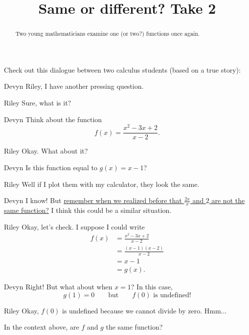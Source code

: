 \documentclass{ximera}
\title[Break-Ground:]{Same or different? Take 2}
\begin{document}
\begin{abstract}
  Two young mathematicians examine one (or two?)  functions once again.
\end{abstract}
\maketitle

Check out this dialogue between two calculus students (based on a true
story):

\begin{dialogue}
\item[Devyn] Riley, I have another pressing question.
\item[Riley] Sure, what is it?
\item[Devyn] Think about the function
\[ f(x) = \frac{x^2-3x+2}{x-2}. \]
\item[Riley] Okay.  What about it?
\item[Devyn] Is this function equal to $g(x) = x-1$?
\item[Riley] Well if I plot them with my calculator, they look the
  same.
\item[Devyn] I know!  But \href{https://ximera.osu.edu/math160fa17/m160prerequisites/understandingFunctions/breakGround}{remember when we realized before that $\frac{2x}{x}$ and $2$ are not the same function?}  I think this could be a similar situation.
\item[Riley] Okay, let's check.  I suppose I could write
  \begin{align*}
    f(x) &= \frac{x^2-3x+2}{x-2} \\
    &= \frac{(x-1)(x-2)}{x-2} \\
    &= x-1 \\
    &= g(x).
  \end{align*}
\item[Devyn] Right! But what about when $x=1$? In this case,
  \[
  g(1) = 0\qquad\text{but}\qquad f(0) \text{ is undefined!}
  \]
\item[Riley] Okay, $f(0)$ is undefined because we cannot divide by
  zero. Hmm... 
\end{dialogue}

\begin{problem}
  In the context above, are $f$ and $g$ the same function?
  \begin{multipleChoice}
  \end{multipleChoice}
\end{problem}
\end{document}
